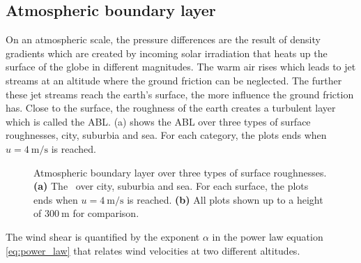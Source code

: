 \subsection{Atmospheric boundary layer}
\label{sec:atmABLbasics}

On an atmospheric scale, the pressure differences are the result of density gradients which are created by incoming solar irradiation that heats up the surface of the globe in different magnitudes.
The warm air rises which leads to jet streams at an altitude where the ground friction can be neglected.
The further these jet streams reach the earth's surface, the more influence the ground friction has. 
Close to the surface, the roughness of the earth creates a turbulent layer which is called the \gls{ABL}.
 (a) shows the \gls{ABL} over three types of surface roughnesses, city, suburbia and sea. For each category, the plots ends when $u = \SI{4}{\metre\per\second}$ is reached.



\begin{figure}[!bt]
	\captionsetup{format=plain}
	\caption[Atmospheric boundary layer over three types of surface roughnesses]{Atmospheric boundary layer over three types of surface roughnesses. \textbf{(a)} The \ABL\ over city, suburbia and sea. For each surface, the plots ends when $u = \SI{4}{\metre\per\second}$ is reached. \textbf{(b)} All plots shown up to a height of $\SI{300}{\metre}$ for comparison. }
	\label{fig:theory:ABL_example}
\end{figure}

The wind shear is quantified by the exponent $\alpha$ in the power law equation \ref{eq:power_law} that relates wind velocities at two different altitudes.

